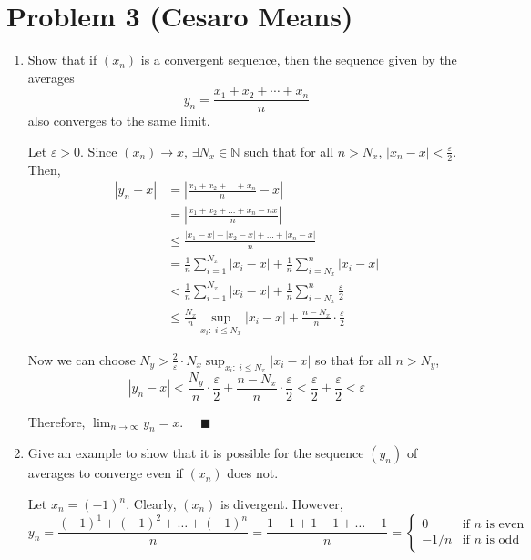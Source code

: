 \documentclass[10pt]{article}
\newcommand{\qed}{\quad \blacksquare}
\newcommand{\abs}[1]{\left\vert #1 \right\vert}
\newcommand{\ep}{\varepsilon}
\newcommand{\N}{\mathbb{N}}
\begin{document}
\pagebreak
\section*{Problem 3 (Cesaro Means)}
\begin{enumerate}
	\item Show that if $(x_n)$ is a convergent sequence, then the sequence given by the averages
	\begin{equation*}
		y_n=\frac{x_1+x_2+\cdots+x_n}{n}
	\end{equation*}
	also converges to the same limit.

        \color{blue}
            Let $\ep > 0$. Since $(x_n) \to x$, $\exists N_x \in \N$ such that for all $n > N_x$, $\abs{x_n - x} < \frac{\ep}{2}$. Then,
            \begin{align*}
                \abs{y_n - x} &= \abs{\frac{x_1 + x_2 + \dots + x_n}{n} - x} \\ 
                    &= \abs{\frac{x_1 + x_2 + \dots + x_n - nx}{n}}\\
                    &\leq \frac{\abs{x_1 - x} + \abs{x_2 - x} + \dots + \abs{x_n - x}}{n}\\
                    &= \frac{1}{n} \sum_{i=1}^{N_x} \abs{x_i - x} + \frac{1}{n}\sum_{i=N_x}^n \abs{x_i - x}\\
                    &< \frac{1}{n} \sum_{i=1}^{N_x} \abs{x_i - x} + \frac{1}{n}\sum_{i=N_x}^n \frac{\ep}{2}\\
                    &\leq \frac{N_x}{n} \sup_{x_i:\; i \leq N_x} \abs{x_i - x} + \frac{n - N_x}{n} \cdot \frac{\ep}{2}
            \end{align*}

            Now we can choose $N_y > \frac{2}{\ep} \cdot N_x \sup_{x_i:\; i \leq N_x} \abs{x_i - x}$ so that for all $n > N_y$, 
            \[\abs{y_n - x} < \frac{N_y}{n}\cdot \frac{\ep}{2} + \frac{n - N_x}{n}\cdot \frac{\ep}{2} < \frac{\ep}{2} + \frac{\ep}{2} < \ep\]

            Therefore, $\lim_{n\to \infty} y_n = x$. $\qed$
        \color{black}


	\item Give an example to show that it is possible for the sequence $(y_n)$ of averages to converge even if $(x_n)$ does not.
        
        \color{blue}
            Let $x_n = (-1)^n$. Clearly, $(x_n)$ is divergent. However, 
            \[y_n = \frac{(-1)^1 + (-1)^2 + \dots + (-1)^n}{n} = \frac{1 - 1 + 1 - 1 + \dots + 1}{n} = \begin{cases}
                0 & \text{if } n \text{ is even}\\
                -1/n & \text{if } n \text{ is odd}
            \end{cases}\]


\end{enumerate}
\end{document}
